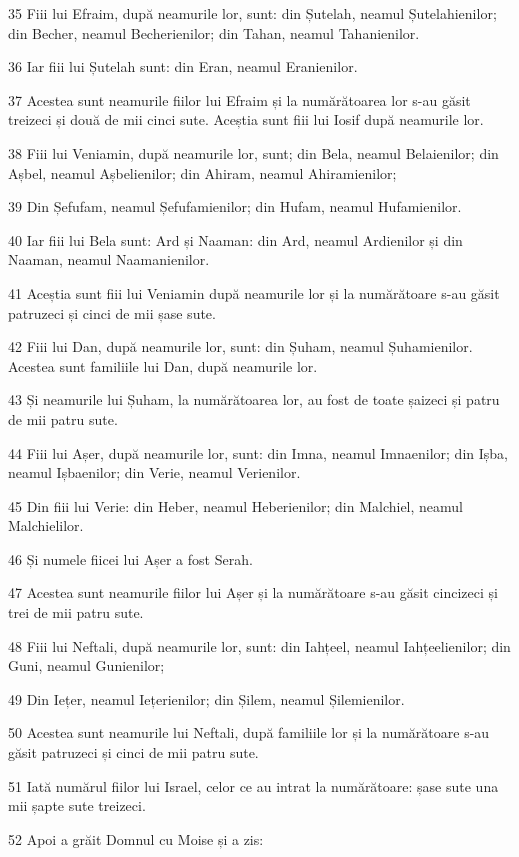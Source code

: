 \par 35 Fiii lui Efraim, după neamurile lor, sunt: din Șutelah, neamul Șutelahienilor; din Becher, neamul Becherienilor; din Tahan, neamul Tahanienilor.
\par 36 Iar fiii lui Șutelah sunt: din Eran, neamul Eranienilor.
\par 37 Acestea sunt neamurile fiilor lui Efraim și la numărătoarea lor s-au găsit treizeci și două de mii cinci sute. Aceștia sunt fiii lui Iosif după neamurile lor.
\par 38 Fiii lui Veniamin, după neamurile lor, sunt; din Bela, neamul Belaienilor; din Așbel, neamul Așbelienilor; din Ahiram, neamul Ahiramienilor;
\par 39 Din Șefufam, neamul Șefufamienilor; din Hufam, neamul Hufamienilor.
\par 40 Iar fiii lui Bela sunt: Ard și Naaman: din Ard, neamul Ardienilor și din Naaman, neamul Naamanienilor.
\par 41 Aceștia sunt fiii lui Veniamin după neamurile lor și la numărătoare s-au găsit patruzeci și cinci de mii șase sute.
\par 42 Fiii lui Dan, după neamurile lor, sunt: din Șuham, neamul Șuhamienilor. Acestea sunt familiile lui Dan, după neamurile lor.
\par 43 Și neamurile lui Șuham, la numărătoarea lor, au fost de toate șaizeci și patru de mii patru sute.
\par 44 Fiii lui Așer, după neamurile lor, sunt: din Imna, neamul Imnaenilor; din Ișba, neamul Ișbaenilor; din Verie, neamul Verienilor.
\par 45 Din fiii lui Verie: din Heber, neamul Heberienilor; din Malchiel, neamul Malchielilor.
\par 46 Și numele fiicei lui Așer a fost Serah.
\par 47 Acestea sunt neamurile fiilor lui Așer și la numărătoare s-au găsit cincizeci și trei de mii patru sute.
\par 48 Fiii lui Neftali, după neamurile lor, sunt: din Iahțeel, neamul Iahțeelienilor; din Guni, neamul Gunienilor;
\par 49 Din Iețer, neamul Iețerienilor; din Șilem, neamul Șilemienilor.
\par 50 Acestea sunt neamurile lui Neftali, după familiile lor și la numărătoare s-au găsit patruzeci și cinci de mii patru sute.
\par 51 Iată numărul fiilor lui Israel, celor ce au intrat la numărătoare: șase sute una mii șapte sute treizeci.
\par 52 Apoi a grăit Domnul cu Moise și a zis:
